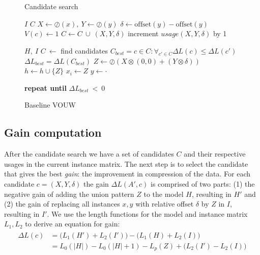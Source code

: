 \documentclass{llncs}
\begin{document}
\begin{figure*}[ttt!]
\begin{minipage}[t]{.49\textwidth}
	\begin{algorithm}[H]
	\caption{Candidate search}
	\begin{algorithmic}[1]
	\Require $I$
	\Ensure $C$
			\State $X \gets \oslash(x), \ Y \gets \oslash(y)$
			\State $\delta \gets \mathrm{offset}(y) - \mathrm{offset}(y)$
				\State $V(c) \gets 1$
			\EndIf
			\State $C \gets C \ \cup \ (X,Y,\delta)$
			\State increment ${usage}(X,Y,\delta)$ by 1
		\EndFor
	\EndFor
	\end{algorithmic}
	\end{algorithm}%
\end{minipage}%
\begin{minipage}[t]{.49\textwidth}
	\begin{algorithm}[H]
	\caption{Baseline VOUW}
	\label{alg:vouw}
	\begin{algorithmic}[1]
	\Require $H,\ I$
		\State $C \ \gets$ find candidates
		\State $C_{best} = c \in C : \forall_{c' \in C} \Delta L(c) \leq \Delta L(c')$
	\State $\Delta L_{best} = \Delta L(C_{best})$
		\State $Z \gets \oslash(X\otimes(0,0) + (Y\otimes\delta))$
		\State $h \gets h \cup \{Z\}$
				\State $x_i \gets Z$
				\State $y \gets \cdot$
			\EndFor
		\EndFor
	\EndIf

	
	\State \textbf{repeat until} $\Delta L_{best} \ < \ 0$
	\end{algorithmic}
	\end{algorithm}
\end{minipage}
\end{figure*}

\subsection{Gain computation}

After the candidate search we have a set of candidates $C$ and their respective usages in the current instance matrix. The next step is to select the candidate that gives the best \emph{gain}: the improvement in compression of the data. For each candidate $c=(X,Y,\delta)$ the gain $\Delta L(A',c)$  is comprised of two parts: (1) the negative gain of adding the union pattern $Z$ to the model $H$, resulting in $H'$ and (2) the gain of replacing all instances $x,y$ with relative offset $\delta$ by $Z$ in $I$, resulting in $I'$. We use the length functions for the model and instance matrix $L_1, L_2$ to derive an equation for gain:
\begin{align}
\label{gain}
\begin{split}
	\Delta L(c) &= \Big(L_1(H') + L_2(I') \Big) - \Big(L_1(H) + L_2(I) \Big) \\
			    &= L_0(|H|) - L_0(|H|+1) - L_p(Z) + \Big(L_2(I') - L_2(I) \Big)
\end{split}
\end{align}
\end{document}
